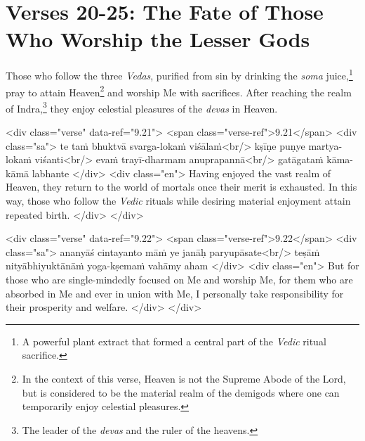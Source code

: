 \section{Verses 20-25: The Fate of Those Who Worship the Lesser Gods}\label{sec-verses-20-25-the-fate-of-those-who-worship-the-lesser-gods}

{Those who follow the three \textit{Vedas}, purified from sin by drinking the \textit{soma} juice,\footnote{A powerful plant extract that formed a central part of the \textit{Vedic} ritual sacrifice.} pray to attain Heaven\footnote{In the context of this verse, Heaven is not the Supreme Abode of the Lord, but is considered to be the material realm of the demigods where one can temporarily enjoy celestial pleasures.} and worship Me with sacrifices. After reaching the realm of Indra,\footnote{The leader of the \textit{devas} and the ruler of the heavens.} they enjoy celestial pleasures of the \textit{devas} in Heaven.}


\begin{html}
<div class="verse" data-ref="9.21">
  <span class="verse-ref">9.21</span>
  <div class="sa">
    te taṁ bhuktvā svarga-lokaṁ viśālaṁ<br/>
    kṣīṇe puṇye martya-lokaṁ viśanti<br/>
    evaṁ trayī-dharmam anuprapannā<br/>
    gatāgataṁ kāma-kāmā labhante
  </div>
  <div class="en">
    Having enjoyed the vast realm of Heaven, they return to the world of mortals once their merit is exhausted. In this way, those who follow the \textit{Vedic} rituals while desiring material enjoyment attain repeated birth.
  </div>
</div>
\end{html}



\begin{html}
<div class="verse" data-ref="9.22">
  <span class="verse-ref">9.22</span>
  <div class="sa">
    ananyāś cintayanto māṁ ye janāḥ paryupāsate<br/>
    teṣāṁ nityābhiyuktānāṁ yoga-kṣemaṁ vahāmy aham
  </div>
  <div class="en">
    But for those who are single-mindedly focused on Me and worship Me, for them who are absorbed in Me and ever in union with Me, I personally take responsibility for their prosperity and welfare.
  </div>
</div>
\end{html}



